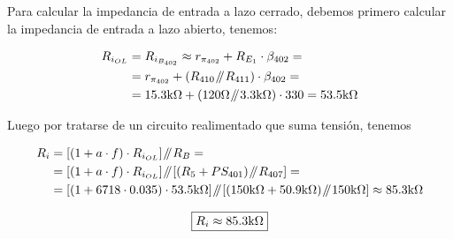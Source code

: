 \vspace{1.5cm}
\label{calculated_zi}

Para calcular la impedancia de entrada a lazo cerrado, debemos primero calcular la impedancia de entrada a lazo abierto, tenemos:

\begin{align}
\begin{split}
R_{i_{OL}} &= R_{i_{B_{402}}} \approx r_{\pi_{402}} + R_{E_{1}} \cdot \beta_{402} = \\
&= r_{\pi_{402}} + \left( R_{410} \parallelresistors R_{411} \right) \cdot \beta_{402} = \\
&= 15.3 \si[per-mode=symbol]{\kilo\ohm} + \left( 120 \si[per-mode=symbol]{\ohm} \parallelresistors 3.3 \si[per-mode=symbol]{\kilo\ohm} \right) \cdot 330 = 53.5 \si[per-mode=symbol]{\kilo\ohm}
\end{split}
\end{align}

Luego por tratarse de un circuito realimentado que suma tensión, tenemos

\begin{align}
\begin{split}
R_{i} &= \left[\left(1 + a \cdot f \right) \cdot R_{i_{OL}} \right] \parallelresistors R_{B} = \\
&= \left[\left(1 + a \cdot f \right) \cdot R_{i_{OL}} \right] \parallelresistors \left[ \left( R_{5} + PS_{401} \right) \parallelresistors R_{407} \right] = \\
&= \left[\left(1 + 6718 \cdot 0.035 \right) \cdot 53.5 \si[per-mode=symbol]{\kilo\ohm} \right] \parallelresistors \left[ \left( 150 \si[per-mode=symbol]{\kilo\ohm} + 50.9 \si[per-mode=symbol]{\kilo\ohm} \right) \parallelresistors 150 \si[per-mode=symbol]{\kilo\ohm} \right] \approx 85.3 \si[per-mode=symbol]{\kilo\ohm}
\end{split}
\end{align}

\begin{equation}
\boxed{ R_{i} \approx 85.3 \si[per-mode=symbol]{\kilo\ohm} }
\end{equation}



\vfill

\clearpage
